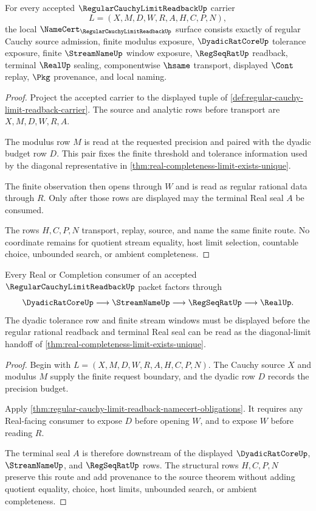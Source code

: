 \begin{theorem}
\label{thm:regular-cauchy-limit-readback-namecert-obligations}
For every accepted $\RegularCauchyLimitReadbackUp$ carrier
$$
L=(X,M,D,W,R,A,H,C,P,N),
$$
the local $\NameCert_{\RegularCauchyLimitReadbackUp}$ surface consists exactly of regular Cauchy source admission, finite modulus exposure, $\DyadicRatCoreUp$ tolerance exposure, finite $\StreamNameUp$ window exposure, $\RegSeqRatUp$ readback, terminal $\RealUp$ sealing, componentwise $\hsame$ transport, displayed $\Cont$ replay, $\Pkg$ provenance, and local naming.
\end{theorem}
\begin{proof}
Project the accepted carrier to the displayed tuple of \autoref{def:regular-cauchy-limit-readback-carrier}. The source and analytic rows before transport are $X,M,D,W,R,A$.

The modulus row $M$ is read at the requested precision and paired with the dyadic budget row $D$. This pair fixes the finite threshold and tolerance information used by the diagonal representative in \autoref{thm:real-completeness-limit-exists-unique}.

The finite observation then opens through $W$ and is read as regular rational data through $R$. Only after those rows are displayed may the terminal Real seal $A$ be consumed.

The rows $H,C,P,N$ transport, replay, source, and name the same finite route. No coordinate remains for quotient stream equality, host limit selection, countable choice, unbounded search, or ambient completeness.
\end{proof}

\begin{theorem}
\label{thm:regular-cauchy-limit-readback-real-handoff}
Every Real or Completion consumer of an accepted $\RegularCauchyLimitReadbackUp$ packet factors through
$$
\DyadicRatCoreUp\longrightarrow \StreamNameUp\longrightarrow \RegSeqRatUp\longrightarrow \RealUp .
$$
The dyadic tolerance row and finite stream windows must be displayed before the regular rational readback and terminal Real seal can be read as the diagonal-limit handoff of \autoref{thm:real-completeness-limit-exists-unique}.
\end{theorem}
\begin{proof}
Begin with $L=(X,M,D,W,R,A,H,C,P,N)$. The Cauchy source $X$ and modulus $M$ supply the finite request boundary, and the dyadic row $D$ records the precision budget.

Apply \autoref{thm:regular-cauchy-limit-readback-namecert-obligations}. It requires any Real-facing consumer to expose $D$ before opening $W$, and to expose $W$ before reading $R$.

The terminal seal $A$ is therefore downstream of the displayed $\DyadicRatCoreUp$, $\StreamNameUp$, and $\RegSeqRatUp$ rows. The structural rows $H,C,P,N$ preserve this route and add provenance to the source theorem without adding quotient equality, choice, host limits, unbounded search, or ambient completeness.
\end{proof}

